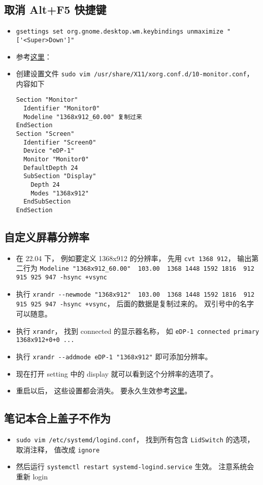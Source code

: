 \subsection{取消 Alt+F5 快捷键}
\begin{itemize}
\item \verb|gsettings set org.gnome.desktop.wm.keybindings unmaximize "['<Super>Down']"|
\item 参考\href{https://askubuntu.com/questions/1322105/cant-find-alt-f5-in-settings-keyboard-shortcuts}{这里}：
\item 创建设置文件 \verb|sudo vim /usr/share/X11/xorg.conf.d/10-monitor.conf|， 内容如下
\begin{lstlisting}[language=none]
Section "Monitor"
  Identifier "Monitor0"
  Modeline "1368x912_60.00" 复制过来
EndSection
Section "Screen"
  Identifier "Screen0"
  Device "eDP-1"
  Monitor "Monitor0"
  DefaultDepth 24
  SubSection "Display"
    Depth 24
    Modes "1368x912"
  EndSubSection
EndSection
\end{lstlisting}
\end{itemize}

\subsection{自定义屏幕分辨率}
\begin{itemize}
\item 在 22.04 下， 例如要定义 1368x912 的分辨率， 先用 \verb|cvt 1368 912|， 输出第二行为 \verb|Modeline "1368x912_60.00"  103.00  1368 1448 1592 1816  912 915 925 947 -hsync +vsync|
\item 执行 \verb|xrandr --newmode "1368x912"  103.00  1368 1448 1592 1816  912 915 925 947 -hsync +vsync|， 后面的数据是复制过来的。 双引号中的名字可以随意。
\item 执行 \verb|xrandr|， 找到 connected 的显示器名称， 如 \verb|eDP-1 connected primary 1368x912+0+0 ...|
\item 执行 \verb|xrandr --addmode eDP-1 "1368x912"| 即可添加分辨率。
\item 现在打开 setting 中的 display 就可以看到这个分辨率的选项了。
\item 重启以后， 这些设置都会消失。 要永久生效参考\href{https://askubuntu.com/questions/1376391/how-to-permanently-save-an-xrandr-configuration-for-a-monitor-even-after-reboot}{这里}。
\end{itemize}


\subsection{笔记本合上盖子不作为}
\begin{itemize}
\item \verb|sudo vim /etc/systemd/logind.conf|， 找到所有包含 \verb|LidSwitch| 的选项， 取消注释， 值改成 \verb|ignore|
\item 然后运行 \verb|systemctl restart systemd-logind.service| 生效。 注意系统会重新 login
\end{itemize}

